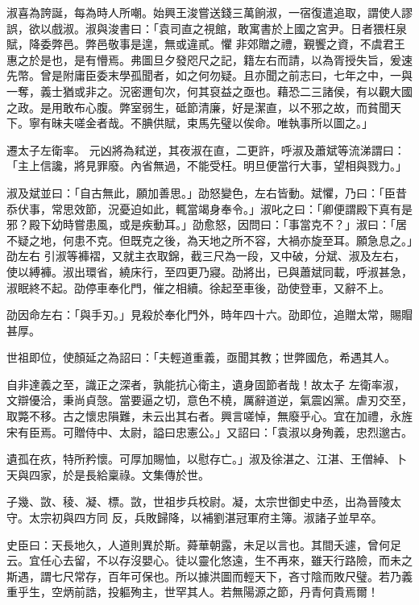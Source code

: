 \begin{pinyinscope}
 淑喜為誇誕，每為時人所嘲。始興王浚嘗送錢三萬餉淑，一宿復遣追取，謂使人謬誤，欲以戲淑。淑與浚書曰：「袁司直之視館，敢寓書於上國之宮尹。日者猥枉泉賦，降委弊邑。弊邑敬事是遑，無或違貳。懼
 非郊贈之禮，覲饗之資，不虞君王惠之於是也，是有懵焉。弗圖旦夕發咫尺之記，籍左右而請，以為胥授失旨，爰速先幣。曾是附庸臣委末學孤聞者，如之何勿疑。且亦聞之前志曰，七年之中，一與一奪，義士猶或非之。況密邇旬次，何其裒益之亟也。藉恐二三諸侯，有以觀大國之政。是用敢布心腹。弊室弱生，砥節清廉，好是潔直，以不邪之故，而貧聞天下。寧有昧夫嗟金者哉。不腆供賦，束馬先璧以俟命。唯執事所以圖之。」



 遷太子左衛率。
 元凶將為弒逆，其夜淑在直，二更許，呼淑及蕭斌等流涕謂曰：「主上信讒，將見罪廢。內省無過，不能受枉。明旦便當行大事，望相與戮力。」



 淑及斌並曰：「自古無此，願加善思。」劭怒變色，左右皆動。斌懼，乃曰：「臣昔忝伏事，常思效節，況憂迫如此，輒當竭身奉令。」淑叱之曰：「卿便謂殿下真有是邪？殿下幼時嘗患風，或是疾動耳。」劭愈怒，因問曰：「事當克不？」淑曰：「居不疑之地，何患不克。但既克之後，為天地之所不容，大禍亦旋至耳。願急息之。」劭左右
 引淑等褲褶，又就主衣取錦，截三尺為一段，又中破，分斌、淑及左右，使以縛褲。淑出環省，繞床行，至四更乃寢。劭將出，已與蕭斌同載，呼淑甚急，淑眠終不起。劭停車奉化門，催之相續。徐起至車後，劭使登車，又辭不上。



 劭因命左右：「與手刃。」見殺於奉化門外，時年四十六。劭即位，追贈太常，賜賵甚厚。



 世祖即位，使顏延之為詔曰：「夫輕道重義，亟聞其教；世弊國危，希遇其人。



 自非達義之至，識正之深者，孰能抗心衛主，遺身固節者哉！故太子
 左衛率淑，文辯優洽，秉尚貞愨。當要逼之切，意色不橈，厲辭道逆，氣震凶黨。虐刃交至，取斃不移。古之懷忠隕難，未云出其右者。興言嗟悼，無廢乎心。宜在加禮，永旌宋有臣焉。可贈侍中、太尉，謚曰忠憲公。」又詔曰：「袁淑以身殉義，忠烈邈古。



 遺孤在疚，特所矜懷。可厚加賜恤，以慰存亡。」淑及徐湛之、江湛、王僧綽、卜天與四家，於是長給稟祿。文集傳於世。



 子幾、敳、稜、凝、標。敳，世祖步兵校尉。凝，太宗世御史中丞，出為晉陵太守。太宗初與四方同
 反，兵敗歸降，以補劉湛冠軍府主簿。淑諸子並早卒。



 史臣曰：天長地久，人道則異於斯。蕣華朝露，未足以言也。其間夭遽，曾何足云。宜任心去留，不以存沒嬰心。徒以靈化悠遠，生不再來，雖天行路險，而未之斯遇，謂七尺常存，百年可保也。所以據洪圖而輕天下，吝寸陰而敗尺璧。若乃義重乎生，空炳前誥，投軀殉主，世罕其人。若無陽源之節，丹青何貴焉爾！



\end{pinyinscope}